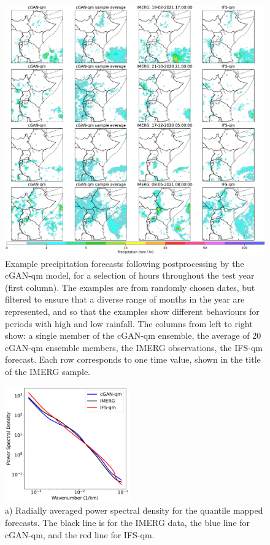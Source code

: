 \documentclass{article}
\begin{document}
\begin{figure}
     \centering
     \includegraphics[width=1.05\textwidth]{images/cGAN_samples_IFS_final-nologs_217600.pdf}
     
     \caption{Example precipitation forecasts following postprocessing by the cGAN-qm model, for a selection of hours throughout the test year (first column). The examples are from randomly chosen dates, but filtered to ensure that a diverse range of months in the year are represented, and so that the examples show different behaviours for periods with high and low rainfall. The columns from left to right show: a single member of the cGAN-qm ensemble, the average of 20 cGAN-qm ensemble members, the IMERG observations, the IFS-qm forecast. Each row corresponds to one time value, shown in the title of the IMERG sample.  }
     \label{fig:examples}
\end{figure}

\begin{figure}
     \centering

     \includegraphics[width=0.48\textwidth]{images/rapsd_final-nologs_217600.pdf}
     
     \caption{a) Radially averaged power spectral density for the quantile mapped forecasts. The black line is for the IMERG data, the blue line for cGAN-qm, and the red line for IFS-qm. 
}
     \label{fig:rapsd}
\end{figure}
\end{document}
